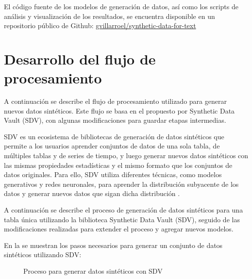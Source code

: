 
El código fuente de los modelos de generación de datos, así como los scripts de análisis y visualización de los resultados, se encuentra disponible en un repositorio público de Github:
\href{https://github.com/gvillarroel/synthetic-data-for-text}{gvillarroel/synthetic-data-for-text}

\section{Desarrollo del flujo de procesamiento}
A continuación se describe el flujo de procesamiento utilizado para generar nuevos datos sintéticos. Este flujo se basa en el propuesto por Synthetic Data Vault (SDV), con algunas modificaciones para guardar etapas intermedias.

SDV es un ecosistema de bibliotecas de generación de datos sintéticos que permite a los usuarios aprender conjuntos de datos de una sola tabla, de múltiples tablas y de series de tiempo, y luego generar nuevos datos sintéticos con las mismas propiedades estadísticas y el mismo formato que los conjuntos de datos originales. Para ello, SDV utiliza diferentes técnicas, como modelos generativos y redes neuronales, para aprender la distribución subyacente de los datos y generar nuevos datos que sigan dicha distribución \cite{kotelnikov_overview_nodate, patki_synthetic_2016}.

A continuación se describe el proceso de generación de datos sintéticos para una tabla única utilizando la biblioteca Synthetic Data Vault (SDV), seguido de las modificaciones realizadas para extender el proceso y agregar nuevos modelos.


\newpage
En la  se muestran los pasos necesarios para generar un conjunto de datos sintéticos utilizando SDV:

\begin{figure}[H]
	\centering
	
	\caption{Proceso para generar datos sintéticos con SDV}
	\label{process-sdv}
\end{figure}


